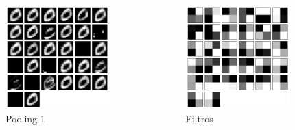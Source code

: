 \documentclass[tikz,10pt]{beamer}
\begin{document}
\begin{frame}
\begin{columns}
		\begin{column}{0.33\textwidth}
			\begin{figure}
				\includegraphics[height=4cm]{images/resultados/network_1/input_1_layer_maxpooling2d_1}
				\caption{Pooling 1}
			\end{figure}%
		\end{column}
		\begin{column}{0.33\textwidth}
			\begin{figure}
				\includegraphics[height=4cm]{images/resultados/network_1/filter_convolution2d_4}%
				\caption{Filtros}			
			\end{figure}%
		\end{column}	
	\end{columns}
	
\end{frame}
\end{document}

